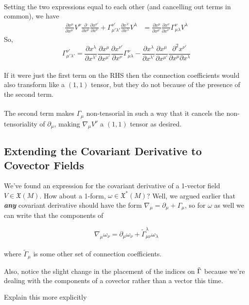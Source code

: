 \documentclass[11pt]{article}
\begin{document}
\\
Setting the two expressions equal to each other (and cancelling out terms in common), we have 
\begin{align*}
  \frac{\partial x^{\mu}}{\partial x^{\mu'}} V^{\nu} \frac{\partial}{\partial x^{\mu}} \frac{\partial x^{\nu'}}{\partial x^{\nu}} + \Gamma_{\mu' \lambda'}^{\nu'} \frac{\partial x^{\lambda'}}{\partial x^{\lambda}} V^{\lambda} &=  \frac{\partial x^{\mu}}{\partial x^{\mu'}} \frac{\partial x^{\nu}}{\partial x^{\nu'}} \Gamma_{\mu \lambda}^{\nu} V^{\lambda}
\end{align*}
So, 
\[ \boxed{  \Gamma_{\mu' \lambda'}^{\nu'} = \frac{\partial x^{\lambda}}{\partial x^{\lambda'}} \frac{\partial x^{\mu}}{\partial x^{\mu'}} \frac{\partial x^{\nu'}}{\partial x^{\nu}} \Gamma_{\mu \lambda}^{\nu} - \frac{\partial x^{\lambda}}{\partial x^{\lambda'}} \frac{\partial x^{\mu}}{\partial x^{\mu'}} \frac{\partial^2 x^{\nu'}}{\partial x^{\mu} \partial x^{\lambda}} } \]
\\
If it were just the first term on the RHS then the connection coefficients would also transform like a $(1,1)$ tensor, but they do not because of the presence of the second term.
\\
\\
The second term makes $\Gamma_{\mu}$ non-tensorial in such a way that it cancels the non-tensoriality of $\partial_{\mu}$, making $\nabla_{\mu} V^{\nu}$ a $(1,1)$ tensor as desired. 
\\
\subsection{Extending the Covariant Derivative to Covector Fields}
We've found an expression for the covariant derivative of a 1-vector field $V \in \mathfrak{X}(M)$. How about a 1-form, $\omega \in \mathfrak{X}^*(M)$? Well, we argued earlier that \emph{\textbf{any}} covariant derivative should have the form $\nabla_{\mu} = \partial_{\mu} + \Gamma_{\mu}$, so for $\omega$ as well we can write that the components of 

\[ \nabla_{\mu} \omega_{\nu} = \partial_{\mu} \omega_{\nu} + \tilde{\Gamma}_{\mu \nu}^{\lambda} \omega_{\lambda} \] \\
where $\tilde{\Gamma}_{\mu}$ is some other set of connection coefficients. 
\begin{dottedbox}
  Also, notice the slight change in the placement of the indices on $\Tilde{\Gamma}$ because we're dealing with the components of a covector rather than a vector this time. 
  \begin{note}
    {Explain this more explicitly}
  \end{note}
\end{dottedbox}
\end{document}
